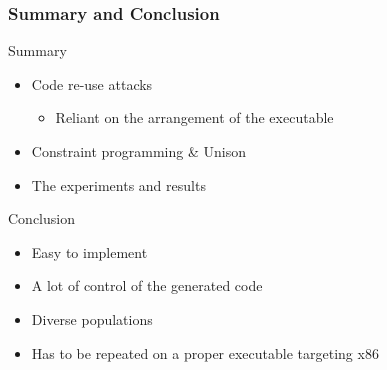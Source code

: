 \documentclass{beamer}
\begin{document}
\begin{frame}
	\frametitle{Summary and Conclusion}

	Summary
	\begin{itemize}
		\item Code re-use attacks
			\begin{itemize}
				\item Reliant on the arrangement of the executable
			\end{itemize}
		\item Constraint programming \& Unison
		\item The experiments and results
	\end{itemize}

	\vspace{0.5cm}

	Conclusion
	\begin{itemize}
		\item Easy to implement
		\item A lot of control of the generated code
		\item Diverse populations
		\item Has to be repeated on a proper executable targeting x86
	\end{itemize}

\end{frame}

\begin{frame}
	\printbibliography[heading=bibintoc]
\end{frame}


\end{document}

